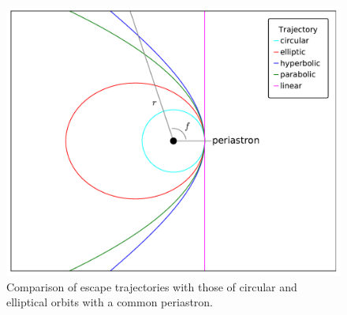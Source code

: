 \documentclass[a4paper,fleqn,usenatbib]{mnras}
\begin{document}
\begin{figure}
\includegraphics[width=\columnwidth]{f1.pdf}
\caption{Comparison of escape trajectories with those of circular and elliptical orbits with a common periastron.}
\label{fig1}
\end{figure}
\end{document}
